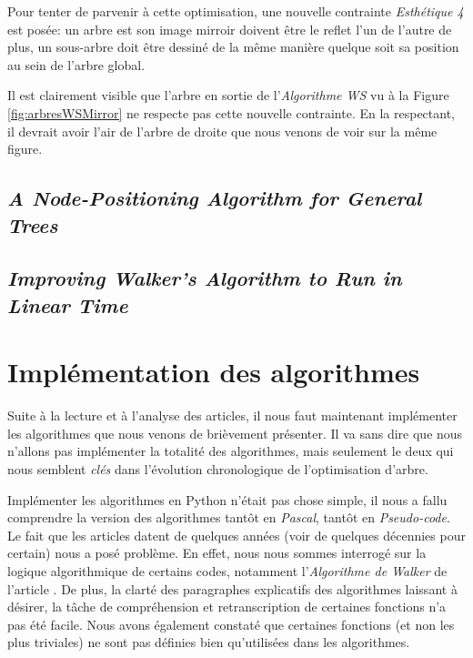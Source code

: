 \documentclass{article}
\begin{document}
  Pour tenter de parvenir à cette optimisation, une nouvelle contrainte \emph{Esthétique 4} est posée: un arbre est son image mirroir doivent être le reflet l'un de l'autre de plus, un sous-arbre doit être dessiné de la même manière quelque soit sa position au sein de l'arbre global.

  Il est clairement visible que l'arbre en sortie de l'\emph{Algorithme WS} vu à la Figure \ref{fig:arbresWSMirror} ne respecte pas cette nouvelle contrainte. En la respectant, il devrait avoir l'air de l'arbre de droite que nous venons de voir sur la même figure.




  \subsection{\emph{A Node-Positioning Algorithm for General Trees}}
  \subsection{\emph{Improving Walker’s Algorithm to Run in Linear Time}}


\newpage
\section{Implémentation des algorithmes}

Suite à la lecture et à l'analyse des articles, il nous faut maintenant implémenter les algorithmes que nous venons de brièvement présenter. Il va sans dire que nous n'allons pas implémenter la totalité des algorithmes, mais seulement le deux qui nous semblent \emph{clés} dans l'évolution chronologique de l'optimisation d'arbre.

Implémenter les algorithmes en Python n'était pas chose simple, il nous a fallu comprendre la version des algorithmes tantôt en \emph{Pascal}, tantôt en \emph{Pseudo-code}. Le fait que les articles datent de quelques années (voir de quelques décennies pour certain) nous a posé problème. En effet, nous nous sommes interrogé sur la logique algorithmique de certains codes, notamment l'\emph{Algorithme de Walker} de l'article \cite{article90}. De plus, la clarté des paragraphes explicatifs des algorithmes laissant à désirer, la tâche de compréhension et retranscription de certaines fonctions n'a pas été facile. Nous avons également constaté que certaines fonctions (et non les plus triviales) ne sont pas définies bien qu'utilisées dans les algorithmes. 
\end{document}
